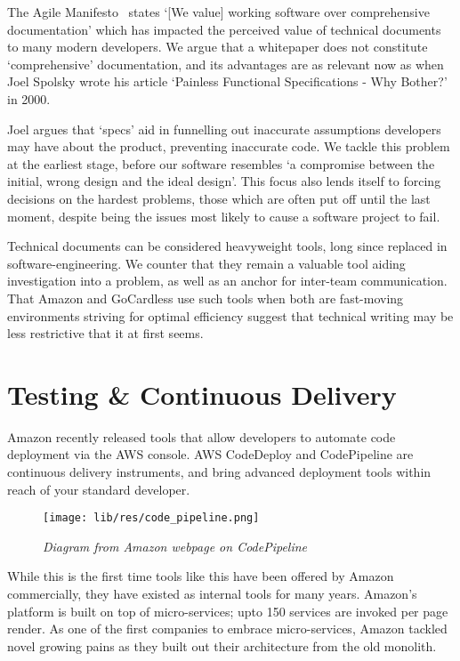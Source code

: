 \documentclass[11pt]{article}
\begin{document}
The Agile Manifesto~\cite{agileManifesto} states `[We value] working software
over comprehensive documentation' which has impacted the perceived value of
technical documents to many modern developers. We argue that a whitepaper does
not constitute `comprehensive' documentation, and its advantages are as relevant
now as when Joel Spolsky wrote his article `Painless Functional Specifications -
Why Bother?' in 2000.

Joel argues that `specs' aid in funnelling out inaccurate assumptions developers
may have about the product, preventing inaccurate code. We tackle this problem
at the earliest stage, before our software resembles `a compromise between the
initial, wrong design and the ideal design'. This focus also lends itself to
forcing decisions on the hardest problems, those which are often put off until
the last moment, despite being the issues most likely to cause a software
project to fail.

Technical documents can be considered heavyweight tools, long since replaced in
software-engineering. We counter that they remain a valuable tool aiding
investigation into a problem, as well as an anchor for inter-team communication.
That Amazon and GoCardless use such tools when both are fast-moving environments
striving for optimal efficiency suggest that technical writing may be less
restrictive that it at first seems.

\section{Testing \& Continuous Delivery}

Amazon recently released tools that allow developers to automate code deployment
via the AWS console. AWS CodeDeploy and CodePipeline are continuous delivery
instruments, and bring advanced deployment tools within reach of your standard
developer.

\begin{figure}
\centering
\texttt{[image: lib/res/code\_pipeline.png]}
\caption{\label{fig:scoping}\textit{Diagram from Amazon webpage on
CodePipeline}}
\end{figure}

While this is the first time tools like this have been offered by Amazon
commercially, they have existed as internal tools for many years. Amazon's
platform is built on top of micro-services; upto 150 services are invoked per
page render. As one of the first companies to embrace micro-services, Amazon
tackled novel growing pains as they built out their architecture from the old
monolith.
\end{document}
